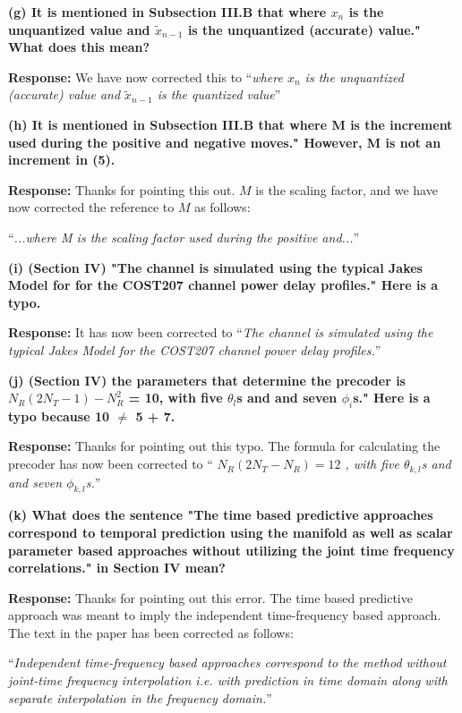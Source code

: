 \documentclass[12pt]{letter}
\begin{document}
\textbf{(g) It is mentioned in Subsection III.B that where $x_n$ is the unquantized value and $\tilde{x}_{n-1}$ is the unquantized (accurate) value." What does this mean?}

\textbf{Response:} We have now corrected this to ``\emph{where $x_n$ is
  the unquantized (accurate) value and $\tilde{x}_{n-1}$ is the
  quantized value}''

\textbf{(h) It is mentioned in Subsection III.B that where M is the increment used during the positive and negative moves." However, M is not an increment in (5).}

\textbf{Response:} Thanks for pointing this out. $M$ is the scaling
factor, and we have now corrected the reference to $M$ as follows:

``\emph{...where M is the scaling factor used during the positive and...}''


\textbf{(i) (Section IV) "The channel is simulated using the typical Jakes Model for for the COST207 channel power delay profiles." Here is a typo.}

\textbf{Response:} It has now been corrected to ``\emph{The channel is simulated using the typical Jakes Model for the COST207 channel power delay profiles.}''

\textbf{(j) (Section IV) the parameters that determine the precoder is $N_R (2N_T - 1) - N^{2}_R$ = 10, with five $\theta_l$s and and seven $\phi_i$s." Here is a typo because 10 $\neq$ 5 + 7.}

\textbf{Response:} Thanks for pointing out this typo. The formula for
calculating the precoder has now been corrected to ``\emph{
  $N_{R}(2N_{T} - N_R) = 12$ , with five $\theta_{k,l}$s and and seven
  $\phi_{k,l}$s.}''

\textbf{(k) What does the sentence "The time based predictive approaches correspond to temporal prediction using the manifold as well as scalar parameter based approaches without utilizing the joint time frequency correlations." in Section IV mean?}

\textbf{Response:} Thanks for pointing out this error. The time based
predictive approach was meant to imply the independent time-frequency based
approach. The text in the paper has been corrected as follows:


``\emph{Independent time-frequency based approaches correspond to the
  method without joint-time frequency interpolation i.e. with
  prediction in time domain along with separate interpolation in the frequency
  domain.}''
\end{document}

